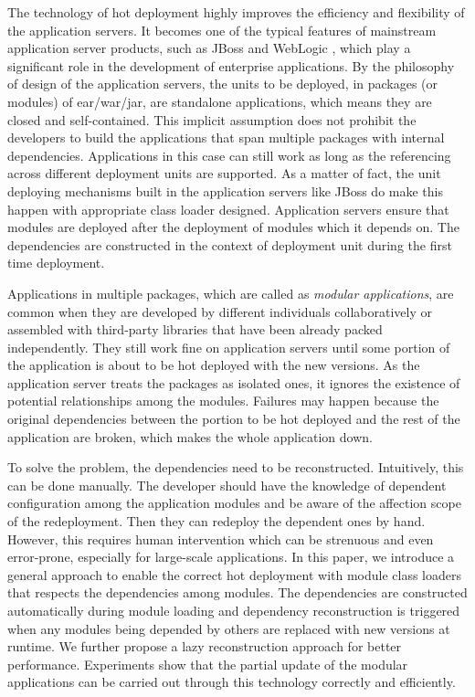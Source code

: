 \documentclass[conference]{IEEEtran}
\begin{document}
The technology of hot deployment highly improves the efficiency and flexibility of the application servers.
It becomes one of the typical features of mainstream application server products, such as JBoss \cite{jboss} and WebLogic \cite{weblogic}, which play a significant role in the development of enterprise applications. By the philosophy of design of the application servers, the units to be deployed, in packages (or modules) of ear/war/jar, are standalone applications, which means they are closed and self-contained. This implicit assumption does not prohibit the developers to build the applications that span multiple packages with internal dependencies. Applications in this case can still work as long as the referencing across different deployment units are supported. As a matter of fact, the unit deploying mechanisms built in the application servers like JBoss do make this happen with appropriate class loader designed. Application servers ensure that modules are deployed after the deployment of modules which it depends on. The dependencies are constructed in the context of deployment unit during the first time deployment.

Applications in multiple packages, which are called as \emph{modular applications}, are common when they are developed by different individuals collaboratively or assembled with third-party libraries that have been already packed independently. They still work fine on application servers until some portion of the application is about to be hot deployed  with the new versions. As the application server treats the packages as isolated ones, it ignores the existence of potential relationships among the modules. Failures may happen because the original dependencies between the portion to be hot deployed and the rest of the application are broken, which makes the whole application down.

To solve the problem, the dependencies need to be reconstructed. Intuitively, this can be done manually. The developer should have the knowledge of dependent configuration among the application modules and be aware of the affection scope of the redeployment. Then they can redeploy the dependent ones by hand. However, this requires human intervention which can be strenuous and even error-prone, especially for large-scale applications. In this paper, we introduce a general approach to enable the correct hot deployment with module class loaders that respects the dependencies among modules. The dependencies are constructed automatically during module loading and dependency reconstruction is triggered when any modules being depended by others are replaced with new versions at runtime. We further propose a lazy reconstruction approach for better performance. Experiments show that the partial update of the modular applications can be carried out through this technology correctly and efficiently.
\end{document}

